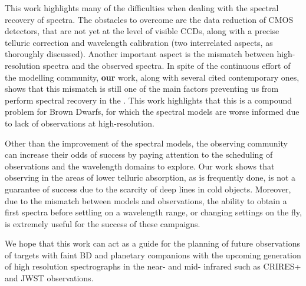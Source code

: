 This work highlights many of the difficulties when dealing with the spectral recovery of \nir{} spectra.
The obstacles to overcome are the data reduction of \nir{} CMOS detectors, that are not yet at the level of visible CCDs, along with a precise telluric correction and wavelength calibration (two interrelated aspects, as thoroughly discussed).
Another important aspect is the mismatch between \nir{} high-resolution spectra and the observed spectra.
In spite of the continuous effort of the modelling community, \textbf{our} work, along with several cited contemporary ones, shows that this mismatch is still one of the main factors preventing us from perform spectral recovery in the \nir{}.
This work highlights that this is a compound problem for Brown Dwarfs, for which the spectral models are worse informed due to lack of observations at high-resolution.

Other than the improvement of the spectral models, the observing community can increase their odds of success by paying attention to the scheduling of observations and the wavelength domains to explore.
Our work shows that observing in the areas of lower telluric absorption, as is frequently done, is not a guarantee of success due to the scarcity of deep lines in cold objects.
Moreover, due to the mismatch between models and observations, the ability to obtain a first spectra before settling on a wavelength range, or changing settings on the fly, is extremely useful for the success of these campaigns.

We hope that this work can act as a guide for the planning of future observations of targets with faint {BD} and planetary companions with the upcoming generation of high resolution spectrographs in the near- and mid- infrared such as CRIRES+ and {JWST} observations.



